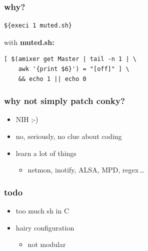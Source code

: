 \documentclass{beamer}
\begin{document}
\begin{frame}[fragile]
  \frametitle{why?}
  \pause
  \begin{verbatim}${execi 1 muted.sh}\end{verbatim}
  \pause
  with \textbf{muted.sh:}
  \begin{verbatim}
[ $(amixer get Master | tail -n 1 | \
    awk '{print $6}') = "[off]" ] \
    && echo 1 || echo 0
  \end{verbatim}
\end{frame}

\begin{frame}[fragile]
  \frametitle{why not simply patch conky?}
  \begin{itemize}
    \pause\item NIH ;-)
    \pause\item no, seriously, no clue about coding
    \pause\item learn a lot of things
    \begin{itemize}
      \pause\item netmon, inotify, ALSA, MPD, regex\,\dots
    \end{itemize}
  \end{itemize}
\end{frame}

\begin{frame}[fragile]
  \frametitle{todo}
  \begin{itemize}
    \pause\item too much sh in C
    \pause\item hairy configuration
    \begin{itemize}
      \item not modular
    \end{itemize}
  \end{itemize}
\end{frame}
\end{document}
